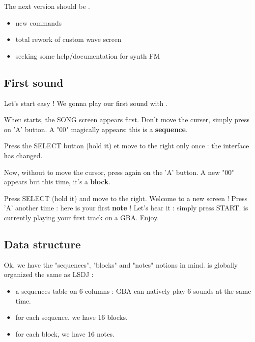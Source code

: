 The next version should be \fatnextversion. \medskip
\begin{itemize}
    \item{new commands}
    \item{total rework of custom wave screen}
    \item{seeking some help/documentation for synth FM}
\end{itemize}

\subsection{First sound}

Let's start easy ! We gonna play our first sound with \FAT.\medskip

When \FAT starts, the SONG screen appears first. Don't move the curser, simply press on 'A' button.
A "00" magically appears: this is a {\bf sequence}.


Press the SELECT button (hold it) et move to the right only once : the interface has changed.


Now, without to move the cursor, press again on the 'A' button. A new "00" appears but this time, it's a {\bf block}.


Press SELECT (hold it) and move to the right. Welcome to a new screen !
Press 'A' another time : here is your first {\bf note} !
Let's hear it : simply press START. \FAT is currently playing your first track on a GBA. Enjoy.


\subsection{Data structure}

Ok, we have the "sequences", "blocks" and "notes" notions in mind. \FAT is globally organized the same as LSDJ :
\begin{itemize}
    \item{a sequences table on 6 columns : GBA can natively play 6 sounds at the same time.}
    \item{for each sequence, we have 16 blocks.}
    \item{for each block, we have 16 notes.}
\end{itemize}\medskip

